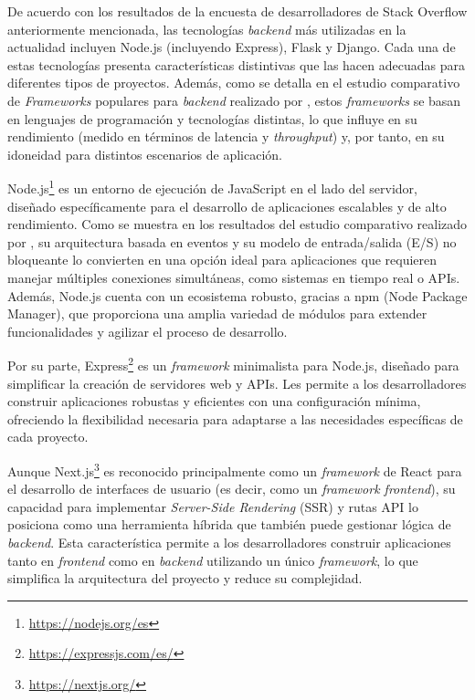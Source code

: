 De acuerdo con los resultados de la encuesta de desarrolladores de Stack Overflow anteriormente mencionada, las tecnologías \textit{backend} más utilizadas en la actualidad incluyen Node.js (incluyendo Express), Flask y Django. Cada una de estas tecnologías presenta características distintivas que las hacen adecuadas para diferentes tipos de proyectos. Además, como se detalla en el estudio comparativo de \textit{Frameworks} populares para \textit{backend} realizado por \cite{Buljic_Kadusic_Cvijanovic_Hadzajlic_Zivic_2025}, estos \textit{frameworks} se basan en lenguajes de programación y tecnologías distintas, lo que influye en su rendimiento (medido en términos de latencia y \textit{throughput}) y, por tanto, en su idoneidad para distintos escenarios de aplicación.

Node.js\footnote{\url{https://nodejs.org/es}} es un entorno de ejecución de JavaScript en el lado del servidor, diseñado específicamente para el desarrollo de aplicaciones escalables y de alto rendimiento. Como se muestra en los resultados del estudio comparativo realizado por \cite{Lei_Ma_Tan_2014}, su arquitectura basada en eventos y su modelo de entrada/salida (E/S) no bloqueante lo convierten en una opción ideal para aplicaciones que requieren manejar múltiples conexiones simultáneas, como sistemas en tiempo real o APIs. Además, Node.js cuenta con un ecosistema robusto, gracias a npm (Node Package Manager), que proporciona una amplia variedad de módulos para extender funcionalidades y agilizar el proceso de desarrollo.

Por su parte, Express\footnote{\url{https://expressjs.com/es/}} es un \textit{framework} minimalista para Node.js, diseñado para simplificar la creación de servidores web y APIs. Les permite a los desarrolladores construir aplicaciones robustas y eficientes con una configuración mínima, ofreciendo la flexibilidad necesaria para adaptarse a las necesidades específicas de cada proyecto.

Aunque Next.js\footnote{\url{https://nextjs.org/}} es reconocido principalmente como un \textit{framework} de React para el desarrollo de interfaces de usuario (es decir, como un \textit{framework frontend}), su capacidad para implementar \textit{Server-Side Rendering} (SSR) y rutas API lo posiciona como una herramienta híbrida que también puede gestionar lógica de \textit{backend}. Esta característica permite a los desarrolladores construir aplicaciones tanto en \textit{frontend} como en \textit{backend} utilizando un único \textit{framework}, lo que simplifica la arquitectura del proyecto y reduce su complejidad.

